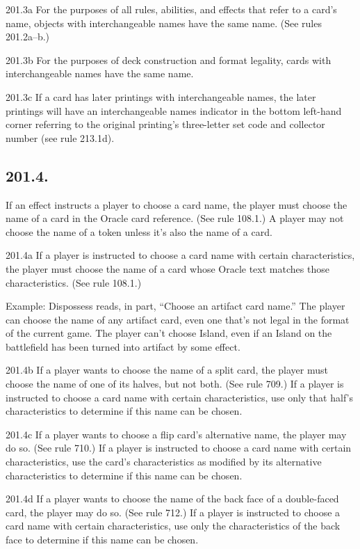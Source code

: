201.3a For the purposes of all rules, abilities, and effects that refer to a card’s name, objects with interchangeable names have the same name. (See rules 201.2a–b.)

201.3b For the purposes of deck construction and format legality, cards with interchangeable names have the same name.

201.3c If a card has later printings with interchangeable names, the later printings will have an interchangeable names indicator in the bottom left-hand corner referring to the original printing’s three-letter set code and collector number (see rule 213.1d).

\subsection*{201.4.}
If an effect instructs a player to choose a card name, the player must choose the name of a card in the Oracle card reference. (See rule 108.1.) A player may not choose the name of a token unless it’s also the name of a card.

201.4a If a player is instructed to choose a card name with certain characteristics, the player must choose the name of a card whose Oracle text matches those characteristics. (See rule 108.1.)

Example: Dispossess reads, in part, “Choose an artifact card name.” The player can choose the name of any artifact card, even one that’s not legal in the format of the current game. The player can’t choose Island, even if an Island on the battlefield has been turned into artifact by some effect.

201.4b If a player wants to choose the name of a split card, the player must choose the name of one of its halves, but not both. (See rule 709.) If a player is instructed to choose a card name with certain characteristics, use only that half’s characteristics to determine if this name can be chosen.

201.4c If a player wants to choose a flip card’s alternative name, the player may do so. (See rule 710.) If a player is instructed to choose a card name with certain characteristics, use the card’s characteristics as modified by its alternative characteristics to determine if this name can be chosen.

201.4d If a player wants to choose the name of the back face of a double-faced card, the player may do so. (See rule 712.) If a player is instructed to choose a card name with certain characteristics, use only the characteristics of the back face to determine if this name can be chosen.


